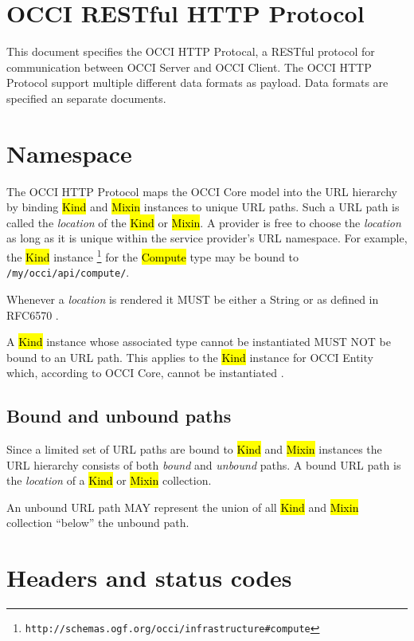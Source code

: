 \documentclass[10pt,a4paper]{article}
\begin{document}
\section{OCCI RESTful HTTP Protocol}

This document specifies the OCCI HTTP Protocal, a RESTful protocol for
communication between OCCI Server and OCCI Client. The OCCI HTTP Protocol
support multiple different data formats as payload. Data formats are specified
an separate documents.

\section{Namespace}

The OCCI HTTP Protocol maps the OCCI Core model into the URL hierarchy by binding
\hl{Kind} and \hl{Mixin} instances to unique URL paths. Such a URL path is called
the {\em location} of the \hl{Kind} or \hl{Mixin}.
A provider is free to choose the {\em location} as long as it is unique
within the service provider's URL namespace.
For example, the \hl{Kind} instance%
\footnote{\tt http://schemas.ogf.org/occi/infrastructure\#compute}
for the \hl{Compute} type may be bound to {\tt /my/occi/api/compute/}.

Whenever a {\em location} is rendered it MUST be either a String or as 
defined in RFC6570 \cite{rfc6570}.

A \hl{Kind} instance whose associated type cannot be instantiated MUST NOT be
bound to an URL path. This applies to the \hl{Kind} instance for OCCI Entity
which, according to OCCI Core, cannot be instantiated \cite{occi:core}.

\subsection{Bound and unbound paths}

Since a limited set of URL paths are bound to \hl{Kind} and \hl{Mixin}
instances the URL hierarchy consists of both {\em bound} and {\em unbound}
paths.
A bound URL path is the {\em location} of a \hl{Kind} or \hl{Mixin} collection.

An unbound URL path MAY represent the union of all \hl{Kind} and \hl{Mixin}
collection ``below'' the unbound path.

\section{Headers and status codes}
\end{document}
